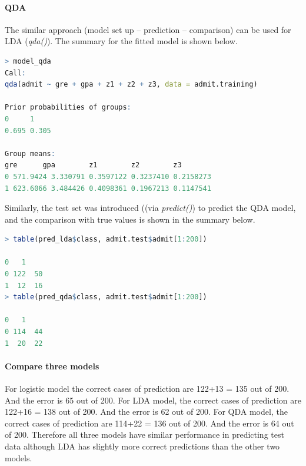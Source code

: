 \documentclass[10pt, letterpaper]{proc}
\begin{document}
\paragraph{QDA} The similar approach (model set up -- prediction -- comparison) can be used for LDA (\textit{qda()}). The summary for the fitted model is shown below.
\begin{lstlisting}[language=R, breaklines=T, basicstyle=\footnotesize\ttfamily]
> model_qda
Call:
qda(admit ~ gre + gpa + z1 + z2 + z3, data = admit.training)

Prior probabilities of groups:
0     1 
0.695 0.305 

Group means:
gre      gpa        z1        z2        z3
0 571.9424 3.330791 0.3597122 0.3237410 0.2158273
1 623.6066 3.484426 0.4098361 0.1967213 0.1147541
\end{lstlisting}

Similarly, the test set was introduced ((via \textit{predict()}) to predict the QDA  model, and the comparison with true values is shown in the summary below.

\begin{lstlisting}[language=R, breaklines=T, basicstyle=\footnotesize\ttfamily]
> table(pred_lda$class, admit.test$admit[1:200])

0   1
0 122  50
1  12  16
> table(pred_qda$class, admit.test$admit[1:200])

0   1
0 114  44
1  20  22
\end{lstlisting}
\paragraph{Compare three models}For logistic model the correct cases of prediction are 122+13 = 135 out of 200. And the error is 65 out of 200. For LDA model, the correct cases of prediction are 122+16 = 138 out of 200. And the error is 62 out of 200. For QDA model, the correct cases of prediction are 114+22 = 136 out of 200. And the error is 64 out of 200. Therefore all three models have similar performance in predicting test data although LDA has slightly more correct predictions than the other two models.

\end{document}
